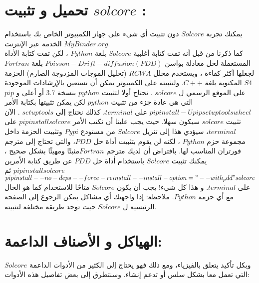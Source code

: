 \section{تحميل و تثبيت $ solcore $ :}
يمكنك تجربة $ Solcore $ دون تثبيت أي شيء على جهاز الكمبيوتر الخاص بك باستخدام الخدمة عبر الإنترنت $ MyBinder.org $. 
\\
كما ذكرنا من قبل أنه تمت كتابة أغلبية  $ Solcore $ بلغة $ Python $ ، لكن تمت كتابة الأداة المستعملة لحل معادلة بواسن  $ Poisson-Drift-diffusion (PDD) $ بلغة $ Fortran  $ لجعلها أكثر كفاءة ، ويستخدم محلل $ RCWA $ (تحليل الموجات المزدوجة الصارم) الحزمة $ S4 $ المكتوبة بلغة $ C ++ $. ولتثبيته على الكمبيوتر يمكن أن نستعين بالإرشادات الموجودة على الموقع الرسمي ل $ solcore $ . نحتاج أولا لتثبيت $ python  $ بنسخة 3.7 أو أعلى  و $ pip $ التي هي عادة جزء من تثبيت $ python  $ لكن يمكن تثبيتها بكتابة الأمر $ pip install -U pip setuptools wheel $ على $ terminal $، كذلك نحتاج إلى $ setuptools $ . الآن تثبيت $ solcore $ سيكون سهلا. حيث يجب علينا أن نكتب الأمر $ pip install solcore $ على $ terminal $، سيؤدي هذا إلى تنزيل $ Solcore $ من مستودع $ Pypi  $ وتثبيت الحزمة داخل مجموعة حزم $ Python $ ، لكنه لن يقوم بتثبيت أداة حل $ PDD  $، والتي تحتاج إلى مترجم فورتران المناسب لها. بافتراض أن لديك مترجم $ Fortran  $مثبتًا ومهيئًا بشكل صحيح ، يمكنك تثبيت $ Solcore $ باستخدام أداة حل $ PDD $ عن طريق كتابة الأمرين $ pip install solcore $ ثم $ pip install --no-deps --force-reinstall --install-option="--with_pdd" solcore $  على $ terminal $. و هذا كل شيء! يجب أن يكون $ Solcore $ متاحًا للاستخدام كما هو الحال مع أي حزمة $ Python $.
ملاحظة: إذا واجهتك أي مشاكل يمكن الرجوع إلى الصفحة الرئيسية ل $ Solcore $ حيث توجد طريقة مختلفة لتثبيته. 
\section{الهياكل و الأصناف الداعمة: }
$ Solcore $ وبكل تأكيد يتعلق بالفيزياء، ومع ذلك فهو يحتاج إلى الكثير من الأدوات الداعمة التي تعمل معا بشكل سلس أو تدعم إنشاء. وسنتطرق إلى بعض تفاصيل هذه الأدوات:
